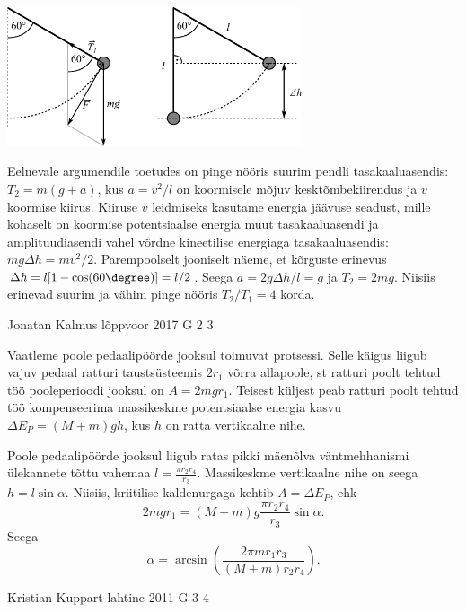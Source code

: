 \documentclass[11pt]{article}
\begin{document}
{{\begin{center}
	\vspace{-10pt}
	\includegraphics[width=0.65\textwidth]{2017-v2g-03-pendel-joonis.pdf}
	\vspace{-15pt}
\end{center}

Eelnevale argumendile toetudes on pinge nööris suurim pendli tasakaaluasendis: $T_2 = m(g + a)$, kus $a = v^2 / l$ on koormisele mõjuv kesktõmbekiirendus ja $v$ koormise kiirus. Kiiruse $v$ leidmiseks kasutame energia jäävuse seadust, mille kohaselt on koormise potentsiaalse energia muut tasakaaluasendi ja amplituudiasendi vahel võrdne kineetilise energiaga tasakaaluasendis: $mg\Delta h = mv^2 / 2$. Parempoolselt jooniselt näeme, et kõrguste erinevus $\Delta h = l[1-\cos(60\degree)] = l / 2$. Seega $a = 2g\Delta h / l = g$ ja $T_2 = 2mg$. Niisiis erinevad suurim ja vähim pinge nööris $T_2 / T_1 = 4$ korda.
\fi
}

{Jonatan Kalmus} %
{lõppvoor} %
{2017} %
{G 2} %
{3} %
{

\ifSolution
Vaatleme poole pedaalipöörde jooksul toimuvat protsessi. Selle käigus liigub vajuv pedaal ratturi taustsüsteemis $2r_1$ võrra allapoole, st ratturi poolt tehtud töö pooleperioodi jooksul on $A = 2mgr_1$. Teisest küljest peab ratturi poolt tehtud töö kompenseerima massikeskme potentsiaalse energia kasvu $\Delta E_P = (M + m)gh$, kus $h$ on ratta vertikaalne nihe. 

Poole pedaalipöörde jooksul liigub ratas pikki mäenõlva väntmehhanismi ülekannete tõttu vahemaa $l=\frac{\pi r_2 r_4}{r_3}$. Massikeskme vertikaalne nihe on seega $h = l\sin\alpha$. Niisiis, kriitilise kaldenurgaga kehtib $A = \Delta E_P$, ehk
\[
2mgr_1 = (M + m)g\frac{\pi r_2r_4}{r_3}\sin\alpha.
\]
Seega
\[
\alpha = \arcsin\left(\frac{2\pi mr_1r_3}{(M + m)r_2r_4}\right).
\]
\fi
}

{Kristian Kuppart} %
{lahtine} %
{2011} %
{G 3} %
{4} %
{

}}
\end{document}

